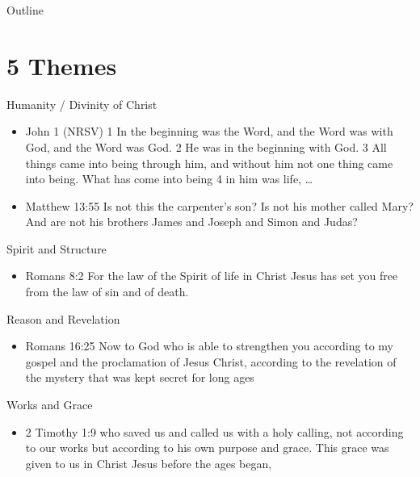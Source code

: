 

\maketitle
\begin{frame}{Outline}
\setcounter{tocdepth}{1}
\tableofcontents
\end{frame}

\section{5 Themes}
\label{sec-1}
\begin{frame}[label=sec-1-1]{Humanity / Divinity of Christ}
\begin{itemize}
\item John 1  (NRSV) 1 In the beginning was the Word, and the Word was with God, and the Word was God. 2 He was in the beginning with God. 3 All things came into being through him, and without him not one thing came into being. What has come into being 4 in him was life, \ldots{}
\item Matthew 13:55 Is not this the carpenter’s son? Is not his mother called Mary? And are not his brothers James and Joseph and Simon and Judas?
\end{itemize}
\end{frame}

\begin{frame}[label=sec-1-2]{Spirit and Structure}
\begin{itemize}
\item Romans 8:2 For the law of the Spirit of life in Christ Jesus has set you free from the law of sin and of death.
\end{itemize}
\end{frame}

\begin{frame}[label=sec-1-3]{Reason and Revelation}
\begin{itemize}
\item Romans 16:25  Now to God who is able to strengthen you according to my gospel and the proclamation of Jesus Christ, according to the revelation of the mystery that was kept secret for long ages
\end{itemize}
\end{frame}

\begin{frame}[label=sec-1-4]{Works and Grace}
\begin{itemize}
\item 2 Timothy 1:9 who saved us and called us with a holy calling, not according to our works but according to his own purpose and grace. This grace was given to us in Christ Jesus before the ages began,
\end{itemize}
\end{frame}

